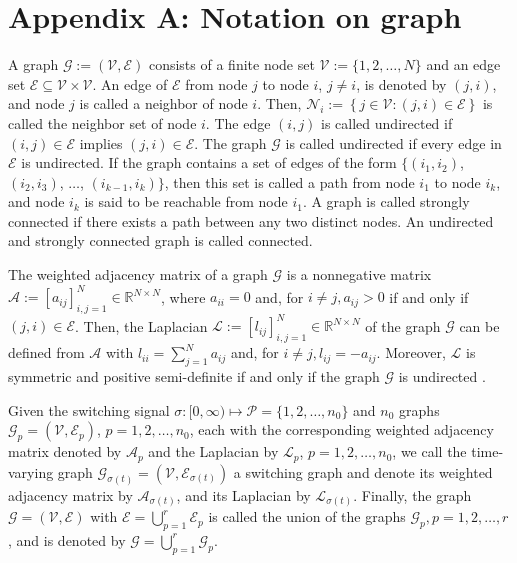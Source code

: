 \documentclass[twocolumn]{autart}
\newcommand{\RR}{\mathbb{R}}
\begin{document}
\section*{Appendix A: Notation on graph}
A graph $\mathcal{G}:=\left(\mathcal{V}, \mathcal{E}\right)$ consists of a finite node set $\mathcal{V}:=\{1, 2, \ldots, N\}$
and an edge set $\mathcal{E} \subseteq \mathcal{V} \times \mathcal{V}$.
An edge of $\mathcal{E}$ from node $j$ to node $i$, $j \ne i$,
is denoted by $(j,i)$, and node $j$ is called a neighbor of node $i$.
Then, $\mathcal{N}_{i}:=\left\{j \in \mathcal{V} : (j,i) \in \mathcal{E} \right\}$ is called the neighbor set of node $i$.
The edge $(i,j)$ is called undirected if $(i,j) \in \mathcal{E}$ implies $(j,i) \in \mathcal{E}$.
The graph $\mathcal{G}$ is called undirected if every edge in $\mathcal{E}$ is undirected.
If the graph contains a set of edges of the form $\{(i_{1},i_{2})$, $(i_{2},i_{3})$,
$\ldots$, $(i_{k-1},i_{k})\}$, then this set is called a path from node $i_{1}$ to node $i_{k}$,
and node $i_{k}$ is said to be reachable from node $i_{1}$.
A graph is called strongly connected if there exists a path between any two distinct nodes.
An undirected and strongly connected graph is called connected.



The weighted adjacency matrix of a graph $\mathcal{G}$ is a nonnegative matrix
$\mathcal{A}:=[a_{ij}]_{i,j=1}^{N} \in \RR^{N \times N}$, where
$a_{ii}=0$ and,
for $i\ne j, a_{ij}>0$ if and only if $ (j,i)\in \mathcal{E}$.
Then, the Laplacian $\mathcal{L}:=[l_{ij}]_{i,j=1}^{N} \in \RR^{N \times N}$ of the graph $\mathcal{G}$
can be defined from $\mathcal{A}$ with $l_{ii}=\sum_{j=1}^{N}a_{ij}$ and,
for $i \ne j, l_{ij}=-a_{ij}$.
Moreover, $\mathcal{L}$ is symmetric and positive semi-definite if and only if the graph $\mathcal{G}$ is undirected \cite{Godsil01}.



Given the switching signal $\sigma: [0,\infty) \mapsto \mathcal{P}=\{1,2,\ldots,n_{0}\}$ and $n_{0}$ graphs
$\mathcal{G}_{p}=(\mathcal{V}, \mathcal{E}_{p})$, $p=1,2,\ldots,n_{0}$,
each with the corresponding weighted adjacency matrix denoted by $\mathcal{A}_{p}$
and the Laplacian by $\mathcal{L}_{p}$, $p=1,2, \ldots, n_{0}$,
we call the time-varying graph $\mathcal{G}_{\sigma(t)}=\left(\mathcal{V},\mathcal{E}_{\sigma(t)}\right)$ a switching graph and denote
its weighted adjacency matrix by $\mathcal{A}_{\sigma(t)}$,
and its Laplacian by $\mathcal{L}_{\sigma(t)}$.
Finally, the graph $\mathcal{G}=\left(\mathcal{V}, \mathcal{E}\right)$ with
$\mathcal{E}= \bigcup_{p=1}^{r} \mathcal{E}_{p}$ is called the union of the graphs $\mathcal{G}_{p}, p=1,2,\ldots,r$,
and is denoted by $\mathcal{G}=\bigcup_{p=1}^{r} \mathcal{G}_{p}$.
\end{document}

